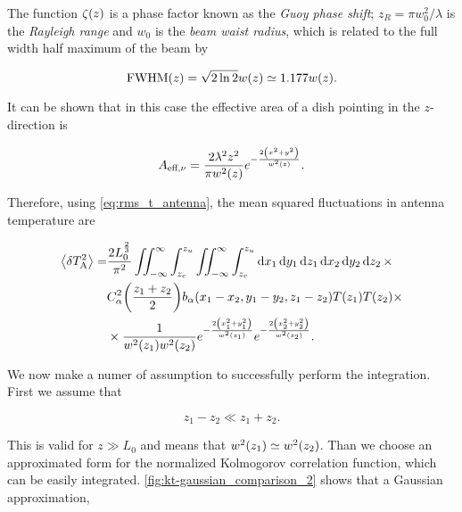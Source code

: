 The function $\zeta\qty(z)$ is a phase factor known as the \emph{Guoy phase
shift}; $z_R = \pi w_0^2/\lambda$ is the \emph{Rayleigh range} and $w_0$ is
the \emph{beam waist radius}, which is related to the full width half
maximum of the beam by

\begin{equation}
        \text{FWHM}\qty(z) = \sqrt{2\ln 2} w\qty(z) \simeq 1.177 w\qty(z).
\end{equation}

It can be shown that in this case the effective area of a dish pointing in
the $z$-direction is

\begin{equation}
        A_{\text{eff},\nu} = \frac{2\lambda^2 z^2}{\pi w^2\qty(z)}
        e^{-\frac{2 \qty(x^2 + y^2)}{w^2\qty(z)}}.
\end{equation}

Therefore, using \autoref{eq:rms_t_antenna}, the mean squared fluctuations
in antenna temperature are

\begin{equation}
        \begin{split}
                \expval{\var{T^2_\text{A}}} = & \frac{2 L^\frac{2}{3}_0}{\pi^2}
                \iint^\infty_{-\infty} \int^{z_u}_{z_c}
                \iint^\infty_{-\infty} \int^{z_u}_{z_c}
                \dd{x_1}\dd{y_1}\dd{z_1}\dd{x_2}\dd{y_2}\dd{z_2} \times \\
                & C^2_\alpha\qty(\frac{z_1 + z_2}{2})
                b_\alpha\qty(x_1 - x_2, y_1 - y_2, z_1 - z_2)
                T\qty(z_1) T\qty(z_2) \times \\
                & \times \frac{1}{w^2\qty(z_1) w^2\qty(z_2)}
                e^{-\frac{2\qty(x^2_1 + y^2_1)}{w^2\qty(z_1)}}
                e^{-\frac{2\qty(x^2_2 + y^2_2)}{w^2\qty(z_2)}}.
        \end{split}
        \label{eq:rms_t_antenna_sdish}
\end{equation}

We now make a numer of assumption to successfully perform the integration.
First we assume that

\begin{equation}
        z_1 - z_2 \ll z_1 + z_2.
\end{equation}

This is valid for $z \gg L_0$ and means that $w^2\qty(z_1) \simeq
w^2\qty(z_2)$. Than we choose an approximated form for the normalized
Kolmogorov correlation function, which can be easily integrated.
\autoref{fig:kt-gaussian_comparison_2} shows that a Gaussian approximation,

